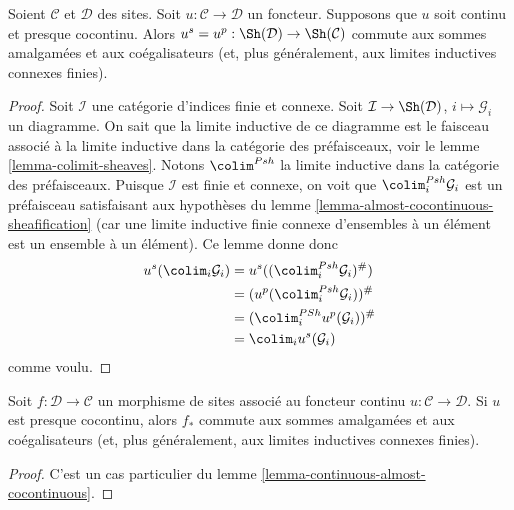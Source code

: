 \begin{lemma}
\label{lemma-continuous-almost-cocontinuous}
Soient $\mathcal{C}$ et $\mathcal{D}$ des sites.
Soit $u : \mathcal{C} \to \mathcal{D}$ un foncteur.
Supposons que $u$ soit continu et presque cocontinu.
Alors $u^s = u^p : \Sh(\mathcal{D}) \to \Sh(\mathcal{C})$
commute aux sommes amalgamées et aux coégalisateurs (et, plus généralement,
aux limites inductives connexes finies).
\end{lemma}

\begin{proof}
Soit $\mathcal{I}$ une catégorie d’indices finie et connexe.
Soit $\mathcal{I} \to \Sh(\mathcal{D})$,
$i \mapsto \mathcal{G}_i$ un diagramme. On sait que la limite inductive de
ce diagramme est le faisceau associé à la limite inductive dans la catégorie des
préfaisceaux, voir le
lemme \ref{lemma-colimit-sheaves}.
Notons $\colim^{Psh}$ la limite inductive dans la catégorie
des préfaisceaux. Puisque $\mathcal{I}$ est finie et connexe,
on voit que $\colim^{Psh}_i \mathcal{G}_i$
est un préfaisceau satisfaisant aux hypothèses du
lemme \ref{lemma-almost-cocontinuous-sheafification}
(car une limite inductive finie connexe d’ensembles à un élément est un
ensemble à un élément). Ce lemme donne donc
\begin{align*}
u^s(\colim_i \mathcal{G}_i) & =
u^s((\colim^{Psh}_i \mathcal{G}_i)^\#) \\
& = (u^p(\colim^{Psh}_i \mathcal{G}_i))^\# \\
& = (\colim^{PSh}_i u^p(\mathcal{G}_i))^\# \\
& = \colim_i u^s(\mathcal{G}_i)
\end{align*}
comme voulu.
\end{proof}

\begin{lemma}
\label{lemma-morphism-of-sites-almost-cocontinuous}
Soit $f : \mathcal{D} \to \mathcal{C}$ un morphisme de sites
associé au foncteur continu $u : \mathcal{C} \to \mathcal{D}$.
Si $u$ est presque cocontinu, alors $f_*$ commute aux
sommes amalgamées et aux coégalisateurs (et, plus généralement, aux limites inductives connexes finies).
\end{lemma}

\begin{proof}
C’est un cas particulier du lemme \ref{lemma-continuous-almost-cocontinuous}.
\end{proof}








